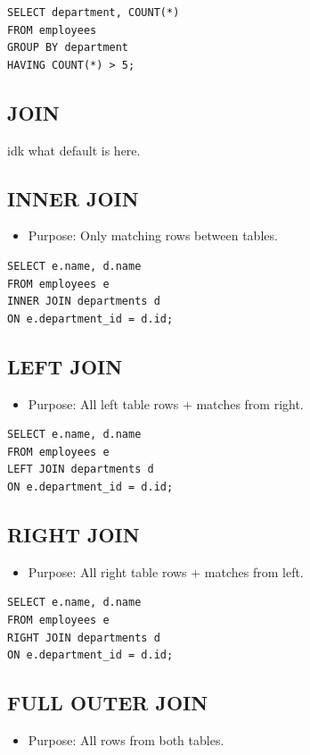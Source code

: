\documentclass[10pt]{article}
\begin{document}
\begin{verbatim}
SELECT department, COUNT(*)
FROM employees
GROUP BY department
HAVING COUNT(*) > 5;
\end{verbatim}

\subsection{JOIN}
idk what default is here.

\subsection{INNER JOIN}
\begin{itemize}
    \item Purpose: Only matching rows between tables.
\end{itemize}

\begin{verbatim}
SELECT e.name, d.name
FROM employees e
INNER JOIN departments d
ON e.department_id = d.id;
\end{verbatim}

\subsection{LEFT JOIN}
\begin{itemize}
    \item Purpose: All left table rows + matches from right.
\end{itemize}

\begin{verbatim}
SELECT e.name, d.name
FROM employees e
LEFT JOIN departments d
ON e.department_id = d.id;
\end{verbatim}

\subsection{RIGHT JOIN}
\begin{itemize}
    \item Purpose: All right table rows + matches from left.
\end{itemize}

\begin{verbatim}
SELECT e.name, d.name
FROM employees e
RIGHT JOIN departments d
ON e.department_id = d.id;
\end{verbatim}

\subsection{FULL OUTER JOIN}
\begin{itemize}
    \item Purpose: All rows from both tables.
\end{itemize}
\end{document}
